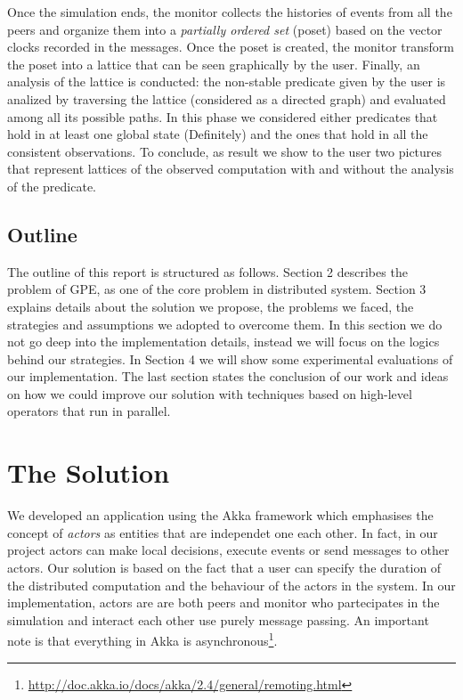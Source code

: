 \documentclass[11pt]{article}
\begin{document}
Once the simulation ends, the monitor collects the histories of events from all the peers and organize them into a \textit{partially ordered set} (poset) based on the vector clocks recorded in the messages. Once the poset is created, the monitor transform the poset into a lattice that can be seen graphically by the user. Finally, an analysis of the lattice is conducted: the non-stable predicate given by the user is analized by traversing the lattice (considered as a directed graph) and evaluated among all its possible paths. In this phase we considered either predicates that hold in at least one global state (Definitely) and the ones that hold in all the consistent observations. To conclude, as result we show to the user two pictures that represent lattices of the observed computation with and without the analysis of the predicate.

\subsection{Outline}

The outline of this report is structured as follows. Section 2 describes the problem of GPE, as one of the core problem in distributed system. Section 3 explains details about the solution we propose, the problems we faced, the strategies and assumptions we adopted to overcome them. In this section we do not go deep into the implementation details, instead we will focus on the logics behind our strategies. In Section 4 we will show some experimental evaluations of our implementation. The last section states the conclusion of our work and ideas on how we could improve our solution with techniques based on high-level operators that run in parallel.

\section{The Solution}

We developed an application using the Akka framework which emphasises the concept of \textit{actors} as entities that are independet one each other. In fact, in our project actors can make local decisions, execute events or send messages to other actors. Our solution is based on the fact that a user can specify the duration of the distributed computation and the behaviour of the actors in the system. In our implementation, actors are are both peers and monitor who partecipates in the simulation and interact each other use purely message passing. An important note is that everything in Akka is asynchronous\footnote{\url{http://doc.akka.io/docs/akka/2.4/general/remoting.html}}.
\end{document}
